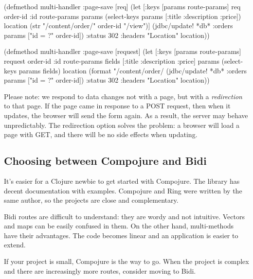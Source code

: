 \begin{clojure}
(defmethod multi-handler :page-save
  [req]
  (let [{:keys [params route-params]} req
        {order-id :id} route-params
        params (select-keys params
                 [:title :description
                  :price])
        location (str "/content/order/"
                   order-id "/view")]
    (jdbc/update! *db* :orders
      params ["id = ?" order-id])
    {:status 302
     :headers {"Location" location}}))
\end{clojure}

\else

\begin{clojure}
(defmethod multi-handler :page-save
  [request]
  (let [{:keys [params route-params]} request
        {order-id :id} route-params
        fields [:title :description :price]
        params (select-keys params fields)
        location (format "/content/order/%
    (jdbc/update! *db* :orders params ["id = ?" order-id])
    {:status 302
     :headers {"Location" location}}))
\end{clojure}

\fi


Please note: we respond to data changes not with a page, but with a  \emph{redirection} to that page. If the page came in response to a POST request, then when it updates, the browser will send the form again. As a result, the server may behave unpredictably. The redirection option solves the problem: a browser will load a page with GET, and there will be no side effects when updating.

\subsection{Choosing between Compojure and Bidi}

It's easier for a Clojure newbie to get started with Compojure. The library has decent documentation with examples. Compojure and Ring were written by the same author, so the projects are close and complementary.

Bidi routes are difficult to understand: they are wordy and not intuitive. Vectors and maps can be easily confused in them. On the other hand, multi-methods have their advantages. The code becomes linear and an application is easier to extend.

If your project is small, Compojure is the way to go. When the project is complex and there are increasingly more routes, consider moving to Bidi.

